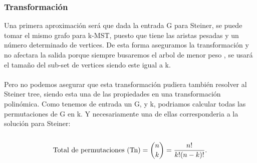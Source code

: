 \documentclass[spanish,12pt]{elsarticle}
\begin{document}
\subsubsection{Transformación}
\textnormal{Una primera aproximación será que dada la entrada G para Steiner, se puede tomar el mismo grafo para k-MST, puesto que tiene las aristas pesadas y un número determinado de vertices. De esta forma aseguramos la transformación y no afectara la salida porque siempre busaremos el arbol de menor peso , se usará el tamaño del sub-set de vertices siendo este igual a k.}\\\\
\textnormal{Pero no podemos asegurar que esta transformación pudiera también resolver al Steiner tree, siendo esta una de las propiedades en una transformación polinómica. Como tenemos de entrada un G, y k, podriamos calcular todas las permutaciones de G en k. Y necesariamente una de ellas corresponderia a la solución para Steiner:}\\\\
\textit{
\[
\textnormal{Total~de~permutaciones (Tn)}= \binom{n}{k} = \frac{n!}{k!(n - k)! }.
\]
}
\end{document}
